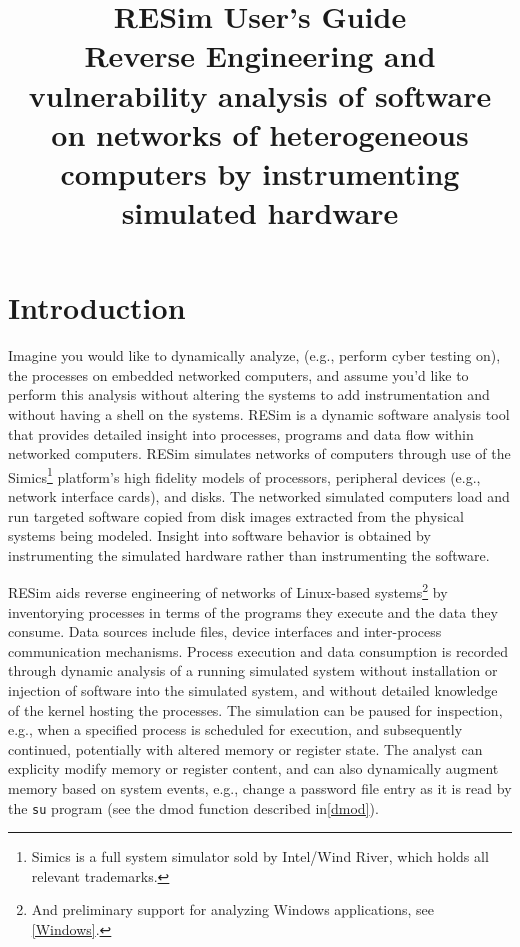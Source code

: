 \documentclass[titlepage]{article}
\begin{document}
\title {%
  RESim User's Guide \\
  \large Reverse Engineering and vulnerability analysis of software on networks of heterogeneous computers
   by instrumenting simulated hardware}
\maketitle
\tableofcontents
\newpage

\section{Introduction}
Imagine you would like to dynamically analyze, (e.g., perform cyber testing on), the processes on embedded networked computers, and assume 
you'd like to perform this analysis without altering the systems to add instrumentation and without having a shell on the systems.
RESim is a dynamic software analysis tool that provides detailed insight into processes, programs and data flow within networked computers.  RESim simulates networks of computers through use of the Simics\footnote{ Simics is a full system simulator sold by Intel/Wind River, which holds all relevant trademarks.} 
platform's high fidelity models of processors, peripheral devices (e.g., network interface cards), and disks.  The networked simulated computers load and run targeted software copied from disk images extracted from the physical systems being modeled.  Insight into software behavior is obtained by instrumenting the simulated hardware
rather than instrumenting the software.

RESim aids reverse engineering of networks of Linux-based systems\footnote{And preliminary support for analyzing Windows applications, see \ref{Windows}.} by inventorying processes in terms of the programs they execute and the data they consume.  Data sources include files, device interfaces and inter-process communication mechanisms.   Process execution and data consumption is recorded through dynamic analysis of a running simulated system without installation or injection of software into the simulated system, and without detailed knowledge of the kernel hosting the processes.
The simulation can be paused for inspection, e.g., when a specified process is scheduled for execution, and subsequently continued, potentially with altered memory or register state.  The analyst can explicity modify memory or register content, and can also dynamically augment memory 
based on system events, e.g., change a password file entry as it is read by the {\tt su} program (see the dmod function described in\ref{dmod}).
\end{document}
